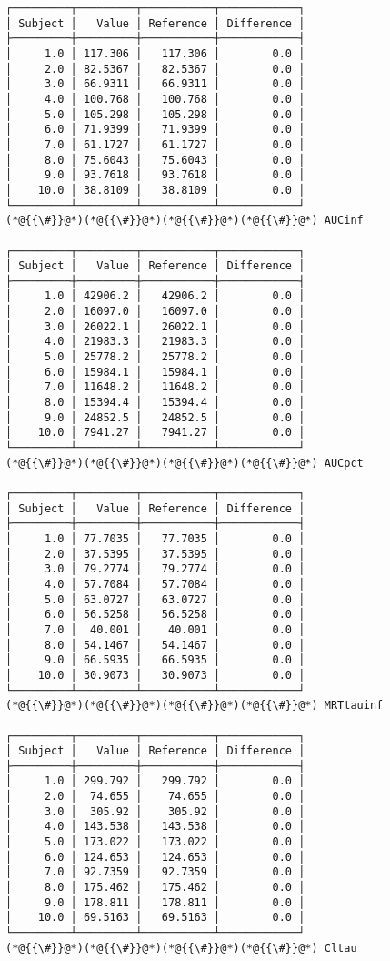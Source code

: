 \documentclass[12pt,a4paper]{article}
\begin{document}
\begin{lstlisting}
┌─────────┬─────────┬───────────┬────────────┐
│ Subject │   Value │ Reference │ Difference │
├─────────┼─────────┼───────────┼────────────┤
│     1.0 │ 117.306 │   117.306 │        0.0 │
│     2.0 │ 82.5367 │   82.5367 │        0.0 │
│     3.0 │ 66.9311 │   66.9311 │        0.0 │
│     4.0 │ 100.768 │   100.768 │        0.0 │
│     5.0 │ 105.298 │   105.298 │        0.0 │
│     6.0 │ 71.9399 │   71.9399 │        0.0 │
│     7.0 │ 61.1727 │   61.1727 │        0.0 │
│     8.0 │ 75.6043 │   75.6043 │        0.0 │
│     9.0 │ 93.7618 │   93.7618 │        0.0 │
│    10.0 │ 38.8109 │   38.8109 │        0.0 │
└─────────┴─────────┴───────────┴────────────┘
(*@{{\#}}@*)(*@{{\#}}@*)(*@{{\#}}@*)(*@{{\#}}@*) AUCinf

┌─────────┬─────────┬───────────┬────────────┐
│ Subject │   Value │ Reference │ Difference │
├─────────┼─────────┼───────────┼────────────┤
│     1.0 │ 42906.2 │   42906.2 │        0.0 │
│     2.0 │ 16097.0 │   16097.0 │        0.0 │
│     3.0 │ 26022.1 │   26022.1 │        0.0 │
│     4.0 │ 21983.3 │   21983.3 │        0.0 │
│     5.0 │ 25778.2 │   25778.2 │        0.0 │
│     6.0 │ 15984.1 │   15984.1 │        0.0 │
│     7.0 │ 11648.2 │   11648.2 │        0.0 │
│     8.0 │ 15394.4 │   15394.4 │        0.0 │
│     9.0 │ 24852.5 │   24852.5 │        0.0 │
│    10.0 │ 7941.27 │   7941.27 │        0.0 │
└─────────┴─────────┴───────────┴────────────┘
(*@{{\#}}@*)(*@{{\#}}@*)(*@{{\#}}@*)(*@{{\#}}@*) AUCpct

┌─────────┬─────────┬───────────┬────────────┐
│ Subject │   Value │ Reference │ Difference │
├─────────┼─────────┼───────────┼────────────┤
│     1.0 │ 77.7035 │   77.7035 │        0.0 │
│     2.0 │ 37.5395 │   37.5395 │        0.0 │
│     3.0 │ 79.2774 │   79.2774 │        0.0 │
│     4.0 │ 57.7084 │   57.7084 │        0.0 │
│     5.0 │ 63.0727 │   63.0727 │        0.0 │
│     6.0 │ 56.5258 │   56.5258 │        0.0 │
│     7.0 │  40.001 │    40.001 │        0.0 │
│     8.0 │ 54.1467 │   54.1467 │        0.0 │
│     9.0 │ 66.5935 │   66.5935 │        0.0 │
│    10.0 │ 30.9073 │   30.9073 │        0.0 │
└─────────┴─────────┴───────────┴────────────┘
(*@{{\#}}@*)(*@{{\#}}@*)(*@{{\#}}@*)(*@{{\#}}@*) MRTtauinf

┌─────────┬─────────┬───────────┬────────────┐
│ Subject │   Value │ Reference │ Difference │
├─────────┼─────────┼───────────┼────────────┤
│     1.0 │ 299.792 │   299.792 │        0.0 │
│     2.0 │  74.655 │    74.655 │        0.0 │
│     3.0 │  305.92 │    305.92 │        0.0 │
│     4.0 │ 143.538 │   143.538 │        0.0 │
│     5.0 │ 173.022 │   173.022 │        0.0 │
│     6.0 │ 124.653 │   124.653 │        0.0 │
│     7.0 │ 92.7359 │   92.7359 │        0.0 │
│     8.0 │ 175.462 │   175.462 │        0.0 │
│     9.0 │ 178.811 │   178.811 │        0.0 │
│    10.0 │ 69.5163 │   69.5163 │        0.0 │
└─────────┴─────────┴───────────┴────────────┘
(*@{{\#}}@*)(*@{{\#}}@*)(*@{{\#}}@*)(*@{{\#}}@*) Cltau


\end{lstlisting}
\end{document}
